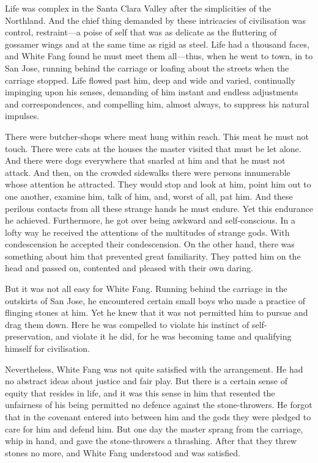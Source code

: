 \documentclass[10pt]{book}
\begin{document}
Life was complex in the Santa Clara Valley after the simplicities of
the Northland. And the chief thing demanded by these intricacies of
civilisation was control, restraint—a poise of self that was as
delicate as the fluttering of gossamer wings and at the same time as
rigid as steel. Life had a thousand faces, and White Fang found he must
meet them all—thus, when he went to town, in to San Jose, running
behind the carriage or loafing about the streets when the carriage
stopped. Life flowed past him, deep and wide and varied, continually
impinging upon his senses, demanding of him instant and endless
adjustments and correspondences, and compelling him, almost always, to
suppress his natural impulses.

There were butcher-shops where meat hung within reach. This meat he
must not touch. There were cats at the houses the master visited that
must be let alone. And there were dogs everywhere that snarled at him
and that he must not attack. And then, on the crowded sidewalks there
were persons innumerable whose attention he attracted. They would stop
and look at him, point him out to one another, examine him, talk of
him, and, worst of all, pat him. And these perilous contacts from all
these strange hands he must endure. Yet this endurance he achieved.
Furthermore, he got over being awkward and self-conscious. In a lofty
way he received the attentions of the multitudes of strange gods. With
condescension he accepted their condescension. On the other hand, there
was something about him that prevented great familiarity. They patted
him on the head and passed on, contented and pleased with their own
daring.

But it was not all easy for White Fang. Running behind the carriage in
the outskirts of San Jose, he encountered certain small boys who made a
practice of flinging stones at him. Yet he knew that it was not
permitted him to pursue and drag them down. Here he was compelled to
violate his instinct of self-preservation, and violate it he did, for
he was becoming tame and qualifying himself for civilisation.

Nevertheless, White Fang was not quite satisfied with the arrangement.
He had no abstract ideas about justice and fair play. But there is a
certain sense of equity that resides in life, and it was this sense in
him that resented the unfairness of his being permitted no defence
against the stone-throwers. He forgot that in the covenant entered into
between him and the gods they were pledged to care for him and defend
him. But one day the master sprang from the carriage, whip in hand, and
gave the stone-throwers a thrashing. After that they threw stones no
more, and White Fang understood and was satisfied.
\end{document}
